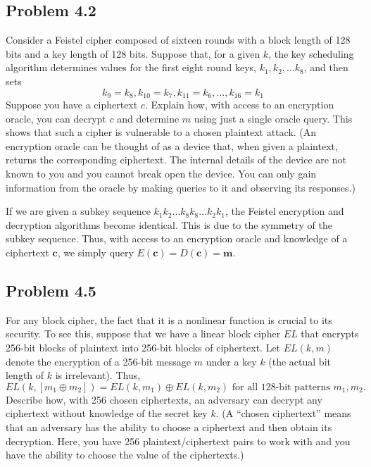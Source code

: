 \documentclass[../hw_sols.tex]{subfiles}
\begin{document}
	
\subsection*{Problem 4.2}
Consider a Feistel cipher composed of sixteen rounds with a block length of 128 bits and a key length of 128 bits. Suppose that, for a given $k$, the key scheduling algorithm determines values for the first eight round keys, $k_1, k_2, \dots k_8$, and then sets
	$$k_9 = k_8, k_{10} = k_7, k_{11} = k_6, \dots, k_{16} = k_1$$
Suppose you have a ciphertext $c$. Explain how, with access to an encryption oracle, you can decrypt $c$ and determine $m$ using just a single oracle query. This shows that such a cipher is vulnerable to a chosen plaintext attack. (An encryption oracle can be thought of as a device that, when given a plaintext, returns the corresponding ciphertext. The internal details of the device are not known to you and you cannot break open the device. You can only gain information from the oracle by making queries to it and observing its responses.)

\begin{solution}
If we are given a subkey sequence $k_1 k_2 \dots k_8 k_8 \dots k_2 k_1$, the Feistel encryption and decryption algorithms become identical. This is due to the symmetry of the subkey sequence. Thus, with access to an encryption oracle and knowledge of a ciphertext $\mathbf{c}$, we simply query 
$E(\mathbf{c}) = D(\mathbf{c}) = \mathbf{m}$.
\end{solution}



\subsection*{Problem 4.5}
For any block cipher, the fact that it is a nonlinear function is crucial to its security. To see this, suppose that we have a linear block cipher $EL$ that encrypts 256-bit blocks of plaintext into 256-bit blocks of ciphertext. Let $EL(k, m)$ denote the encryption of a 256-bit message $m$ under a key $k$ (the actual bit length of $k$ is irrelevant). Thus,
	$$EL(k,[m_1 \oplus m_2]) = 
	EL(k,m_1) \oplus EL(k,m_2) \text{ for all 128-bit patterns } m_1,m_2.$$
Describe how, with 256 chosen ciphertexts, an adversary can decrypt any ciphertext without knowledge of the secret key $k$. (A “chosen ciphertext” means that an adversary has the ability to choose a ciphertext and then obtain its decryption. Here, you have 256 plaintext/ciphertext pairs to work with and you have the ability to choose the value of the ciphertexts.)
\end{document}

